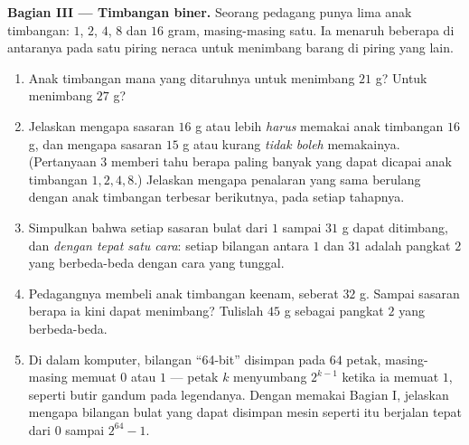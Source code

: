 \begin{problem}[{Soal akhir pekan --- \omterm{def:g1:addition:def}{jumlah} geometri
$1 + 2 + 4 + \dots + 2^{n-1} = 2^n - 1$, dari legenda yang terkenal
sampai bilangan biner}]
\medskip
\noindent\textbf{Bagian III --- Timbangan biner.}
Seorang pedagang punya lima anak timbangan: $1$, $2$, $4$, $8$ dan
$16$ gram, masing-masing satu. Ia menaruh beberapa di antaranya pada
satu piring neraca untuk menimbang barang di piring yang lain.
\begin{enumerate}[resume]
  \item Anak timbangan mana yang ditaruhnya untuk menimbang $21$ g?
        Untuk menimbang $27$ g?
  \item Jelaskan mengapa sasaran $16$ g atau lebih \emph{harus}
        memakai anak timbangan $16$ g, dan mengapa sasaran $15$ g
        atau kurang \emph{tidak boleh} memakainya. (Pertanyaan 3
        memberi tahu berapa paling banyak yang dapat dicapai anak
        timbangan $1, 2, 4, 8$.) Jelaskan mengapa penalaran yang
        sama berulang dengan anak timbangan terbesar berikutnya,
        pada setiap tahapnya.
  \item Simpulkan bahwa setiap sasaran bulat dari $1$ sampai $31$ g
        dapat ditimbang, dan \emph{dengan tepat satu cara}: setiap
        bilangan antara $1$ dan $31$ adalah  pangkat $2$ yang
        berbeda-beda dengan cara yang tunggal.
  \item Pedagangnya membeli anak timbangan keenam, seberat $32$ g.
        Sampai sasaran berapa ia kini dapat menimbang? Tulislah
        $45$ g sebagai  pangkat $2$ yang berbeda-beda.
  \item Di dalam komputer, bilangan ``64-bit'' disimpan pada $64$
        petak, masing-masing memuat $0$ atau $1$ --- petak $k$
        menyumbang $2^{k-1}$ ketika ia memuat $1$, seperti butir
        gandum pada legendanya. Dengan memakai Bagian I, jelaskan
        mengapa bilangan bulat yang dapat disimpan mesin seperti itu
        berjalan tepat dari $0$ sampai
        $2^{64} - 1$.

\end{enumerate}
\end{problem}
